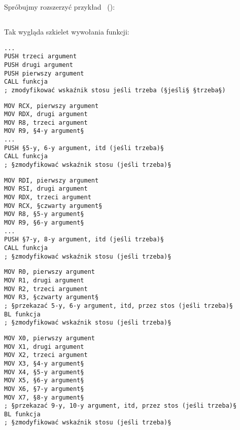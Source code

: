 \mysection{\PrintfSeveralArgumentsSectionName}

Spróbujmy rozszerzyć przykład \emph{\HelloWorldSectionName}~():







\subsection{\Conclusion{}}

Tak wygląda szkielet wywołania funkcji:

\begin{lstlisting}[caption=x86,style=customasmx86]
...
PUSH trzeci argument 
PUSH drugi argument
PUSH pierwszy argument
CALL funkcja
; zmodyfikować wskaźnik stosu jeśli trzeba (§jeśli§ §trzeba§)
\end{lstlisting}

\begin{lstlisting}[caption=x64 (MSVC),style=customasmx86]
MOV RCX, pierwszy argument
MOV RDX, drugi argument
MOV R8, trzeci argument
MOV R9, §4-y argument§
...
PUSH §5-y, 6-y argument, itd (jeśli trzeba)§
CALL funkcja
; §zmodyfikować wskaźnik stosu (jeśli trzeba)§
\end{lstlisting}

\begin{lstlisting}[caption=x64 (GCC),style=customasmx86]
MOV RDI, pierwszy argument
MOV RSI, drugi argument
MOV RDX, trzeci argument
MOV RCX, §czwarty argument§
MOV R8, §5-y argument§
MOV R9, §6-y argument§
...
PUSH §7-y, 8-y argument, itd (jeśli trzeba)§
CALL funkcja
; §zmodyfikować wskaźnik stosu (jeśli trzeba)§
\end{lstlisting}

\begin{lstlisting}[caption=ARM,style=customasmARM]
MOV R0, pierwszy argument
MOV R1, drugi argument
MOV R2, trzeci argument
MOV R3, §czwarty argument§
; §przekazać 5-y, 6-y argument, itd, przez stos (jeśli trzeba)§
BL funkcja
; §zmodyfikować wskaźnik stosu (jeśli trzeba)§
\end{lstlisting}

\begin{lstlisting}[caption=ARM64,style=customasmARM]
MOV X0, pierwszy argument
MOV X1, drugi argument
MOV X2, trzeci argument
MOV X3, §4-y argument§
MOV X4, §5-y argument§
MOV X5, §6-y argument§
MOV X6, §7-y argument§
MOV X7, §8-y argument§
; §przekazać 9-y, 10-y argument, itd, przez stos (jeśli trzeba)§
BL funkcja
; §zmodyfikować wskaźnik stosu (jeśli trzeba)§
\end{lstlisting}

